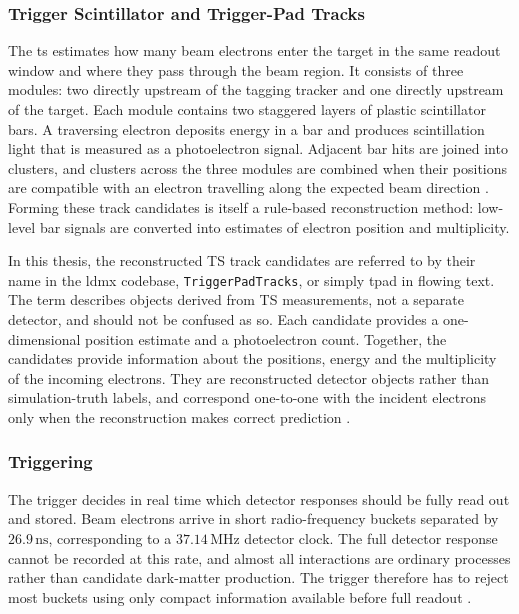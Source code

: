\subsubsection{Trigger Scintillator and Trigger-Pad Tracks}

The \gls{ts} estimates how many beam electrons enter the target in the same
readout window and where they pass through the beam region. It consists of
three modules: two directly upstream of the tagging tracker and one directly
upstream of the target. Each module contains two staggered layers of plastic
scintillator bars. A traversing electron deposits energy in a bar and produces
scintillation light that is measured as a photoelectron signal. Adjacent bar
hits are joined into clusters, and clusters across the three modules are
combined when their positions are compatible with an electron travelling
along the expected beam direction \cite{ldmx2025-overview}. Forming these
track candidates is itself a rule-based reconstruction method: low-level bar
signals are converted into estimates of electron position and multiplicity.

In this thesis, the reconstructed TS track candidates are referred to by
their name in the \gls{ldmx} codebase, \texttt{TriggerPadTracks}, or simply \gls{tpad} in flowing text. The
term describes objects derived from TS measurements, not a separate detector,
and should not be confused as so. Each
candidate provides a one-dimensional position estimate and a photoelectron
count. Together, the candidates provide information about the positions, energy and the 
multiplicity of the incoming electrons. They are reconstructed detector
objects rather than simulation-truth labels, and correspond one-to-one with
the incident electrons only when the reconstruction makes correct prediction \cite{ldmx2025-overview}.

\subsubsection{Triggering}

The trigger decides in real time which detector responses should be fully
read out and stored. Beam electrons arrive in short radio-frequency buckets
separated by \(26.9\,\mathrm{ns}\), corresponding to a
\(37.14\,\mathrm{MHz}\) detector clock. The full detector response cannot be
recorded at this rate, and almost all interactions are ordinary processes
rather than candidate dark-matter production. The trigger therefore has to
reject most buckets using only compact information available before full
readout \cite{ldmx2025-overview}.

